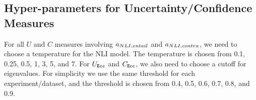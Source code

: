 \subsection{Hyper-parameters for Uncertainty/Confidence Measures}
For all $U$ and $C$ measures involving $a_{NLI,entail}$ and $a_{NLI,contra}$, we need to choose a temperature for the NLI model.
The temperature is chosen from 0.1, 0.25, 0.5, 1, 3, 5, and 7.
For $U_\texttt{Ecc}$ and $C_\texttt{Ecc}$, we also need to choose a cutoff for eigenvalues.
For simplicity we use the same threshold for each experiment/dataset, and the threshold is chosen from 0.4, 0.5, 0.6, 0.7, 0.8, and 0.9.